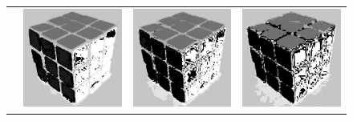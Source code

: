 \begin{figure}
\begin{tabular}{rccc}
         \raisebox{\raiselength}{Hue} &
         \includegraphics[width=\rubiklength]{img/rubik/1_hsv_h.jpg} & 
         \includegraphics[width=\rubiklength]{img/rubik/2_hsv_h.jpg} & \includegraphics[width=\rubiklength]{img/rubik/3_hsv_h.jpg}\\
         

\end{tabular}
\end{figure}
